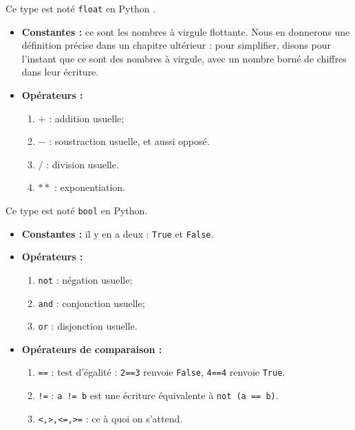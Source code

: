 \begin{defi}[Flottants]
Ce type est noté \texttt{float} en Python .
\begin{itemize}
\item  \textbf{Constantes :} ce sont les {nombres à virgule flottante}. Nous en
donnerons une définition précise dans un chapitre ultérieur : pour simplifier, disons pour 
l'instant que ce sont des nombres à virgule, avec un nombre borné de chiffres dans leur écriture.
\item \textbf{Opérateurs : }
\begin{enumerate}
 \item $+$ : addition usuelle;
 \item $-$ : soustraction usuelle, et aussi opposé.
\item  $/$ : division usuelle.
\item $**$ : exponentiation. %
\end{enumerate}
\end{itemize}
\end{defi}



\begin{defi}[Expression -- Booléen]
Ce type est noté \texttt{bool} en Python.
\begin{itemize}
\item \textbf{Constantes :} il y en a deux : \texttt{True} et \texttt{False}.
\item \textbf{Opérateurs :}
\begin{enumerate}
 \item \texttt{not} : négation usuelle;
 \item \texttt{and} : conjonction usuelle;
 \item \texttt{or} : disjonction usuelle.
\end{enumerate}
\item \textbf{Opérateurs de comparaison :}
\begin{enumerate}
 \item \texttt{==} : test d'égalité : \texttt{2==3} renvoie \texttt{False}, \texttt{4==4} renvoie 
\texttt{True}. %
 \item \texttt{!=} : \texttt{a != b} est une écriture équivalente à \texttt{not (a == b)}.
 \item \texttt{<,>,<=,>=} : ce à quoi on s'attend.
\end{enumerate}
\end{itemize}
\end{defi}


